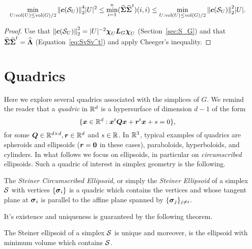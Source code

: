 \begin{observation}
	\begin{equation*}
	\min_{U:\textnormal{vol}(U)\leq \textnormal{vol}(G)/2} \norm{\vb*{c}(\mathcal{S}_U)}_2^4 |U|^2  \leq \min_{i=1}^n (\widehat{\boldsymbol{\Sigma}}\widehat{\boldsymbol{\Sigma}}^t)(i,i) \leq \min_{U:\textnormal{vol}(U)\leq \textnormal{vol}(G)/2} \norm{\vb*{c}(\mathcal{S}_U)}_2^2 |U|.  
	\end{equation*}
\end{observation}
\begin{proof}
	Use that $\norm{\vb*{c}(\mathcal{S}_U)}_2^2 =  |U|^{-2} \boldsymbol{\chi}_U\vb*{L}_G\boldsymbol{\chi}_U$ (Section~\ref{sec:S_G}) and that $\widehat{\boldsymbol{\Sigma}}\widehat{\boldsymbol{\Sigma}}^t=\widehat{\vb{\Lambda}}$ (Equation~\eqref{eq:SvSv^t}) and apply Cheeger's inequality. 
\end{proof}


\section{Quadrics}
\label{sec:quadrics}

Here we explore several quadrics associated with the simplices of $G$. 
We remind the reader that a  \emph{quadric} in $\mathbb{R}^d$ is a hypersurface of dimension $d-1$ of the form 
\begin{equation*}
\{\vb*{x}\in\mathbb{R}^d: \vb*{x}^t \vb*{Q}\vb*{x} + \vb*{r}^t \vb*{x} + s=0\},
\end{equation*}
for some $\vb*{Q}\in\mathbb{R}^{d\times d},\vb*{r}\in\mathbb{R}^d$  and $s\in \mathbb{R}$. 
In $\mathbb{R}^3$, typical examples of quadrics are spheroids and ellipsoids ($\vb*{r}=\vb{0}$ in these cases), paraboloids, hyperboloids, and  cylinders. In what follows we focus on ellipsoids, in particular on \emph{circumscribed} ellipsoids. Such a quadric of interest in simplex geometry is the following. 

\begin{definition}
\label{def:steiner_ellipsoid}
The \emph{Steiner Circumscribed Ellipsoid}, or simply the \emph{Steiner Ellipsoid} of a simplex $\mathcal{S}$ with vertices $\{\vb*{\sigma}_i\}$ is a quadric which contains the vertices and whose tangent plane at $\vb*{\sigma}_i$ is parallel to the affine plane spanned by $\{\vb*{\sigma}_j\}_{j\neq i}$. 
\end{definition}

It's existence  and uniqueness is guaranteed by the following theorem. 

\begin{theorem}
The Steiner ellipsoid of a simplex $\mathcal{S}$ is unique and moreover, is the ellipsoid with minimum volume which contains $\mathcal{S}$. 
\end{theorem}

